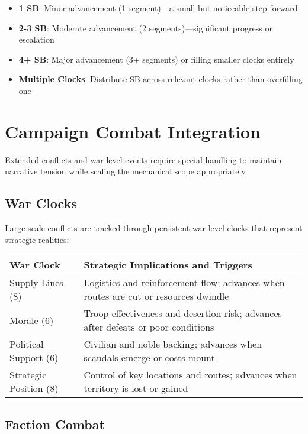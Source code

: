 \begin{itemize}
    \item \textbf{1 SB}: Minor advancement (1 segment)—a small but noticeable step forward
    \item \textbf{2-3 SB}: Moderate advancement (2 segments)—significant progress or escalation
    \item \textbf{4+ SB}: Major advancement (3+ segments) or filling smaller clocks entirely
    \item \textbf{Multiple Clocks}: Distribute SB across relevant clocks rather than overfilling one
\end{itemize}

\section*{Campaign Combat Integration}

Extended conflicts and war-level events require special handling to maintain narrative tension while scaling the mechanical scope appropriately.

\subsection*{War Clocks}

Large-scale conflicts are tracked through persistent war-level clocks that represent strategic realities:

\begin{fatebox}
\begin{tabularx}{\textwidth}{lX}
\toprule
\textbf{War Clock} & \textbf{Strategic Implications and Triggers} \\
\midrule
Supply Lines (8) & Logistics and reinforcement flow; advances when routes are cut or resources dwindle \\
Morale (6) & Troop effectiveness and desertion risk; advances after defeats or poor conditions \\
Political Support (6) & Civilian and noble backing; advances when scandals emerge or costs mount \\
Strategic Position (8) & Control of key locations and routes; advances when territory is lost or gained \\
\bottomrule
\end{tabularx}
\end{fatebox}

\subsection*{Faction Combat}

